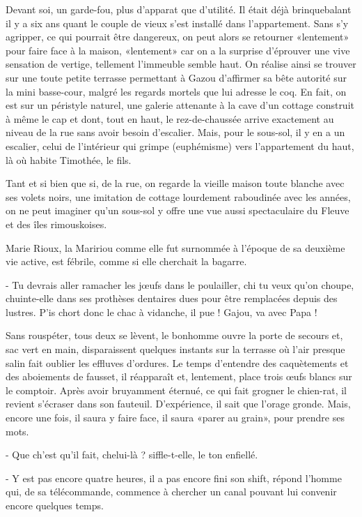 Devant soi, un garde-fou, plus d’apparat que d’utilité. Il était déjà brinquebalant il y a six ans quant le couple de vieux s’est installé dans l’appartement. Sans s’y agripper, ce qui pourrait être dangereux, on peut alors se retourner «lentement» pour faire face à la maison, «lentement» car on a la surprise d’éprouver une vive sensation de vertige, tellement l’immeuble semble haut. On réalise ainsi se trouver sur une toute petite terrasse permettant à Gazou d’affirmer sa bête autorité sur la mini basse-cour, malgré les regards mortels que lui adresse le coq. En fait, on est sur un péristyle naturel, une galerie attenante à la cave d’un cottage construit à même le cap et dont, tout en haut, le rez-de-chaussée arrive exactement au niveau de la rue sans avoir besoin d’escalier. Mais, pour le sous-sol, il y en a un escalier, celui de l’intérieur qui grimpe (euphémisme) vers l’appartement du haut, là où habite Timothée, le fils.

Tant et si bien que si, de la rue, on regarde la vieille maison toute blanche avec ses volets noirs, une imitation de cottage lourdement raboudinée avec les années, on ne peut imaginer qu’un sous-sol y offre une vue aussi spectaculaire du Fleuve et des îles rimouskoises.

Marie Rioux, la Maririou comme elle fut surnommée à l’époque de sa deuxième vie active, est fébrile, comme si elle cherchait la bagarre.

- Tu devrais aller ramacher les jœufs dans le poulailler, chi tu veux qu’on choupe, chuinte-elle dans ses prothèses dentaires dues pour être remplacées depuis des lustres. P’is chort donc le chac à vidanche, il pue ! Gajou, va avec Papa !

Sans rouspéter, tous deux se lèvent, le bonhomme ouvre la porte de secours et, sac vert en main, disparaissent quelques instants sur la terrasse où l’air presque salin fait oublier les effluves d’ordures. Le temps d’entendre des caquètements et des aboiements de fausset, il réapparaît et, lentement, place trois œufs blancs sur le comptoir. Après avoir bruyamment éternué, ce qui fait grogner le chien-rat, il revient s’écraser dans son fauteuil. D’expérience, il sait que l’orage gronde. Mais, encore une fois, il saura y faire face, il saura «parer au grain», pour prendre ses mots.

- Que ch’est qu’il fait, chelui-là ? siffle-t-elle, le ton enfiellé.

- Y est pas encore quatre heures, il a pas encore fini son shift, répond l’homme qui, de sa télécommande, commence à chercher un canal pouvant lui convenir encore quelques temps.

